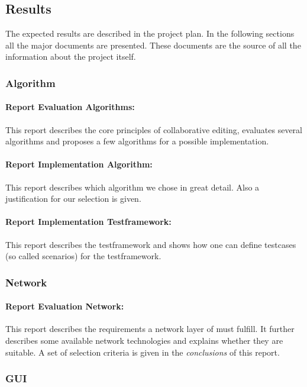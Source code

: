 \documentclass[11pt,a4paper]{article}
\begin{document}
\subsection{Results}
The expected results are described in the project plan. In the following sections all the major documents are presented. These documents are the source of all the information about the project itself.

\subsubsection{Algorithm}
\paragraph{Report Evaluation Algorithms:} 
This report describes the core principles of collaborative editing, evaluates several algorithms and proposes a few algorithms for a possible implementation.

\paragraph{Report Implementation Algorithm:} 
This report describes which algorithm we chose in great detail. Also a justification for our selection is given.

\paragraph{Report Implementation Testframework:}
This report describes the testframework and shows how one can define testcases (so called scenarios) for the testframework.

\subsubsection{Network}
\paragraph{Report Evaluation Network:}
This report describes the requirements a network layer of \ace must fulfill. It further describes some available network technologies and explains whether they are suitable. A set of selection criteria is given in the \emph{conclusions} of this report.

\subsubsection{GUI}
\end{document}
